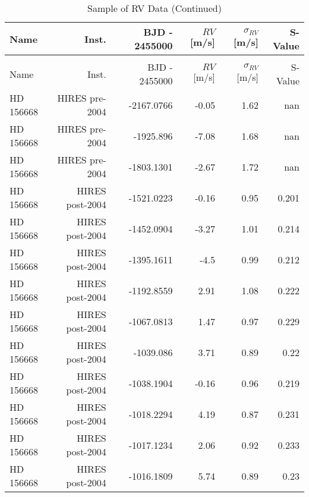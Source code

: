 \begin{longtable*}{lrrrrr}
\caption{Sample of RV Data} \\
\toprule 
\midrule 

Name & Inst. & BJD - 2455000 & $RV$ [m/s] & $\sigma_{RV}$ [m/s] & S-Value \\ 
\toprule 
\endfirsthead 
\caption[]{Sample of RV Data (Continued)} \\
\toprule 
\midrule 
Name & Inst. & BJD - 2455000 & $RV$ [m/s] & $\sigma_{RV}$ [m/s] & S-Value \\ 
\toprule 
\endhead 
HD 156668 & HIRES pre-2004 & -2167.0766 & -0.05 & 1.62 & nan \\ 
HD 156668 & HIRES pre-2004 & -1925.896 & -7.08 & 1.68 & nan \\ 
HD 156668 & HIRES pre-2004 & -1803.1301 & -2.67 & 1.72 & nan \\ 
HD 156668 & HIRES post-2004  & -1521.0223 & -0.16 & 0.95 & 0.201 \\ 
HD 156668 & HIRES post-2004  & -1452.0904 & -3.27 & 1.01 & 0.214 \\ 
HD 156668 & HIRES post-2004  & -1395.1611 & -4.5 & 0.99 & 0.212 \\ 
HD 156668 & HIRES post-2004  & -1192.8559 & 2.91 & 1.08 & 0.222 \\ 
HD 156668 & HIRES post-2004  & -1067.0813 & 1.47 & 0.97 & 0.229 \\ 
HD 156668 & HIRES post-2004  & -1039.086 & 3.71 & 0.89 & 0.22 \\ 
HD 156668 & HIRES post-2004  & -1038.1904 & -0.16 & 0.96 & 0.219 \\ 
HD 156668 & HIRES post-2004  & -1018.2294 & 4.19 & 0.87 & 0.231 \\ 
HD 156668 & HIRES post-2004  & -1017.1234 & 2.06 & 0.92 & 0.233 \\ 
HD 156668 & HIRES post-2004  & -1016.1809 & 5.74 & 0.89 & 0.23 \\ 
\bottomrule 
\end{longtable*} 
